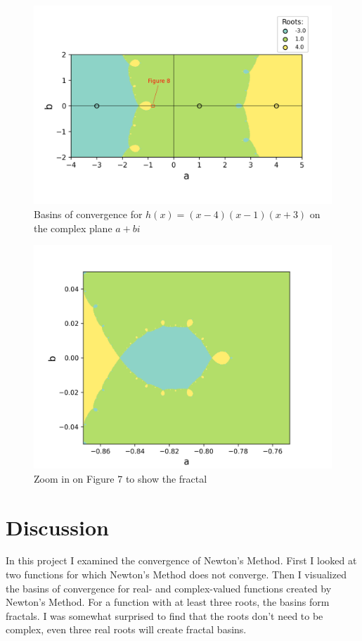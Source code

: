 \documentclass[10pt,a4paper]{article}
\begin{document}
		\begin{figure}[H]
			\centering
			\caption{Basins of convergence for $h(x) =  (x - 4)(x - 1)(x + 3)$ on the complex plane $a+bi$}
			\includegraphics[scale=0.5]{figure7}
		\end{figure}
	
		\begin{figure}[H]
			\centering
			\caption{Zoom in on Figure 7 to show the fractal}
			\includegraphics[scale=0.5]{figure8}
		\end{figure}
		
	\section{Discussion}
	In this project I examined the convergence of Newton's Method. First I looked at two functions for which Newton's Method does not converge. Then I visualized the basins of convergence for real- and complex-valued functions created by Newton's Method. For a function with at least three roots, the basins form fractals. I was somewhat surprised to find that the roots don't need to be complex, even three real roots will create fractal basins.
\end{document}
